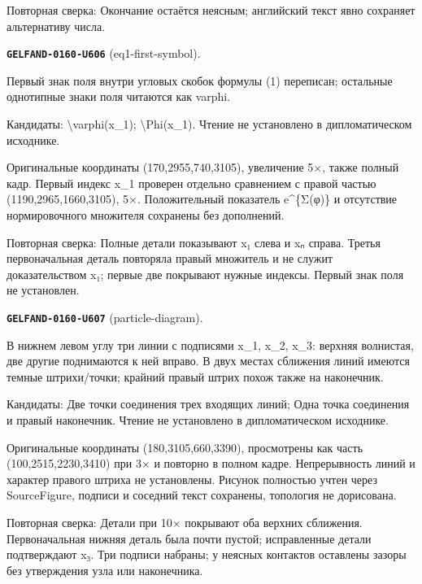 Повторная сверка: Окончание остаётся неясным; английский текст явно сохраняет альтернативу числа.\par\medskip
\par\noindent\leavevmode{}\label{GELFAND-0160-U606}\label{GELFAND-P001483:eq1-first-symbol}\textbf{\texttt{GELFAND-0160-U606}} (eq1-first-symbol).\nopagebreak[4]\par
Первый знак поля внутри угловых скобок формулы (1) переписан; остальные однотипные знаки поля читаются как varphi.\par
Кандидаты: \textbackslash{}varphi(x\_1); \textbackslash{}Phi(x\_1). Чтение не установлено в дипломатическом исходнике.\par
Оригинальные координаты (170,2955,740,3105), увеличение 5×, также полный кадр. Первый индекс x\_1 проверен отдельно сравнением с правой частью (1190,2965,1660,3105), 5×. Положительный показатель e\textasciicircum{}\{Σ(φ)\} и отсутствие нормировочного множителя сохранены без дополнений.\par
Повторная сверка: Полные детали показывают x₁ слева и xₙ справа. Третья первоначальная деталь повторяла правый множитель и не служит доказательством x₁; первые две покрывают нужные индексы. Первый знак поля не установлен.\par\medskip
\par\noindent\leavevmode{}\label{GELFAND-0160-U607}\label{GELFAND-P001483:particle-diagram}\textbf{\texttt{GELFAND-0160-U607}} (particle-diagram).\nopagebreak[4]\par
В нижнем левом углу три линии с подписями x\_1, x\_2, x\_3: верхняя волнистая, две другие поднимаются к ней вправо. В двух местах сближения линий имеются темные штрихи/точки; крайний правый штрих похож также на наконечник.\par
Кандидаты: Две точки соединения трех входящих линий; Одна точка соединения и правый наконечник. Чтение не установлено в дипломатическом исходнике.\par
Оригинальные координаты (180,3105,660,3390), просмотрены как часть (100,2515,2230,3410) при 3× и повторно в полном кадре. Непрерывность линий и характер правого штриха не установлены. Рисунок полностью учтен через SourceFigure, подписи и соседний текст сохранены, топология не дорисована.\par
Повторная сверка: Детали при 10× покрывают оба верхних сближения. Первоначальная нижняя деталь была почти пустой; исправленные детали подтверждают x₃. Три подписи набраны; у неясных контактов оставлены зазоры без утверждения узла или наконечника.\par\medskip
